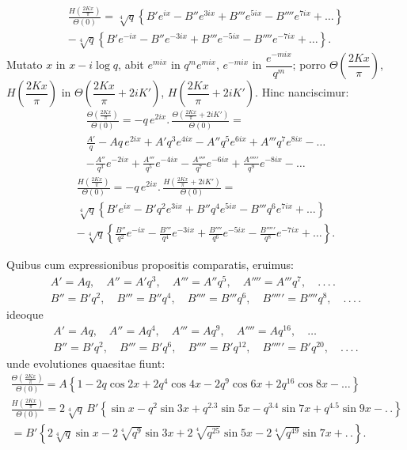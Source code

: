 \documentclass{article}
\begin{document}
\[
\begin{gathered}
\frac{H\left(\frac{2Kx}{\pi}\right)}{\Theta(0)}=\sqrt[4]{q}\left\{B'e^{ix}-B''e^{3ix}+B'''e^{5ix}-B''''e^{7ix}+\ldots\right\}\\[1.5ex]
-\sqrt[4]{q}\left\{B'e^{-ix}-B''e^{-3ix}+B'''e^{-5ix}-B''''e^{-7ix}+\ldots\right\}.
\end{gathered}
\]
Mutato $x$ in $x-i\log q$, abit $e^{mix}$ in $q^{m}e^{mix}$, $e^{-mix}$ in $\dfrac{e^{-mix}}{q^{m}}$; porro $\Theta\left(\dfrac{2Kx}{\pi}\right)$, $H\left(\dfrac{2Kx}{\pi}\right)$ in $\Theta\left(\dfrac{2Kx}{\pi}+2iK'\right)$, $H\left(\dfrac{2Kx}{\pi}+2iK'\right)$. Hinc nanciscimur:
\[
\begin{gathered}
\frac{\Theta\left(\frac{2Kx}{\pi}\right)}{\Theta(0)}=-q\,e^{2ix}.\,\frac{\Theta\left(\frac{2Kx}{\pi}+2iK'\right)}{\Theta(0)}=\\[1.5ex]
\frac{A'}{q}-Aq\,e^{2ix}+A'q^{3}e^{4ix}-A''q^{5}e^{6ix}+A'''q^{7}e^{8ix}-\ldots\\[1.5ex]
-\frac{A''}{q^{3}}e^{-2ix}+\frac{A'''}{q^{5}}e^{-4ix}-\frac{A''''}{q^{7}}e^{-6ix}+\frac{A'''''}{q^{9}}e^{-8ix}-\ldots
\end{gathered}
\]
\[
\begin{gathered}
\frac{H\left(\frac{2Kx}{\pi}\right)}{\Theta(0)}=-q\,e^{2ix}.\,\frac{H\left(\frac{2Kx}{\pi}+2iK'\right)}{\Theta(0)}=\\[1.5ex]
\sqrt[4]{q}\left\{B'e^{ix}-B'q^{2}e^{3ix}+B''q^{4}e^{5ix}-B'''q^{6}e^{7ix}+\ldots\right\}\\[1.5ex]
-\sqrt[4]{q}\left\{\frac{B''}{q^{2}}e^{-ix}-\frac{B'''}{q^{4}}e^{-3ix}+\frac{B''''}{q^{6}}e^{-5ix}-\frac{B'''''}{q^{8}}e^{-7ix}+\ldots\right\}.
\end{gathered}
\]

Quibus cum expressionibus propositis comparatis, eruimus:
\[
\begin{gathered}
A'=Aq,\quad A''=A'q^{3},\quad A'''=A''q^{5},\quad A''''=A'''q^{7},\quad.\,.\,.\,.\\[1ex]
B''=B'q^{2},\quad B'''=B''q^{4},\quad B''''=B'''q^{6},\quad B'''''=B''''q^{8},\quad.\,.\,.\,.
\end{gathered}
\]
ideoque
\[
\begin{gathered}
A'=Aq,\quad A''=Aq^{4},\quad A'''=Aq^{9},\quad A''''=Aq^{16},\quad\ldots\\[1ex]
B''=B'q^{2},\quad B'''=B'q^{6},\quad B''''=B'q^{12},\quad B'''''=B'q^{20},\quad.\,.\,.\,.
\end{gathered}
\]
unde evolutiones quaesitae fiunt:
\[
\begin{gathered}
\frac{\Theta\left(\frac{2Kx}{\pi}\right)}{\Theta(0)}=A\left\{1-2q\cos 2x+2q^{4}\cos 4x-2q^{9}\cos 6x+2q^{16}\cos 8x-\ldots\right\}\\[2ex]
\frac{H\left(\frac{2Kx}{\pi}\right)}{\Theta(0)}=2\sqrt[4]{q}\,B'\left\{\sin x-q^{2}\sin 3x+q^{2.3}\sin 5x-q^{3.4}\sin 7x+q^{4.5}\sin 9x-.\,.\right\}\\[1.5ex]
=B'\left\{2\sqrt[4]{q}\sin x-2\sqrt[4]{q^{9}}\sin 3x+2\sqrt[4]{q^{25}}\sin 5x-2\sqrt[4]{q^{49}}\sin 7x+.\,.\right\}.
\end{gathered}
\]
\end{document}
